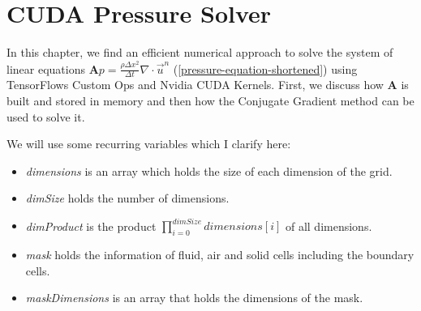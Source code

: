 \chapter{CUDA Pressure Solver}\label{chapter:cudapressuresolver}
In this chapter, we find an efficient numerical approach to solve the system of linear equations $\mathbf{A}p = \frac{\rho \Delta x^2}{\Delta t}\nabla \cdot \vec{u}^n$ (\ref{pressure-equation-shortened}) using TensorFlows Custom Ops and Nvidia CUDA Kernels. First, we discuss how \textbf{A} is built and stored in memory and then how the Conjugate Gradient method can be used to solve it. 
\par We will use some recurring variables which I clarify here:
\begin{itemize}
	\setlength\itemsep{-0.3em}
	\item \textit{dimensions} is an array which holds the size of each dimension of the grid.
	\item \textit{dimSize} holds the number of dimensions.
	\item \textit{dimProduct} is the product $\prod_{i=0}^{dimSize} \textit{dimensions}[i]$ of all dimensions. 
	\item \textit{mask} holds the information of fluid, air and solid cells including the boundary cells.
	\item \textit{maskDimensions} is an array that holds the dimensions of the mask.
\end{itemize}


